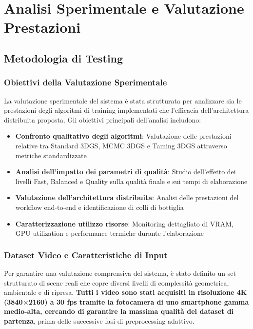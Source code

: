 \chapter{Analisi Sperimentale e Valutazione Prestazioni}
\label{chap:analisi_sperimentale}

\section{Metodologia di Testing}
\label{sec:metodologia_testing}

\subsection{Obiettivi della Valutazione Sperimentale}
\label{subsec:obiettivi_valutazione}

La valutazione sperimentale del sistema è stata strutturata per analizzare sia le prestazioni degli algoritmi di training implementati che l'efficacia dell'architettura distribuita proposta. Gli obiettivi principali dell'analisi includono:

\begin{itemize}
	\item \textbf{Confronto qualitativo degli algoritmi}: Valutazione delle prestazioni relative tra Standard 3DGS, MCMC 3DGS e Taming 3DGS attraverso metriche standardizzate
	\item \textbf{Analisi dell'impatto dei parametri di qualità}: Studio dell'effetto dei livelli Fast, Balanced e Quality sulla qualità finale e sui tempi di elaborazione
	\item \textbf{Valutazione dell'architettura distribuita}: Analisi delle prestazioni del workflow end-to-end e identificazione di colli di bottiglia
	\item \textbf{Caratterizzazione utilizzo risorse}: Monitoring dettagliato di VRAM, GPU utilization e performance termiche durante l'elaborazione
\end{itemize}

\subsection{Dataset Video e Caratteristiche di Input}
\label{subsec:dataset_video_input}

Per garantire una valutazione comprensiva del sistema, è stato definito un set strutturato di scene reali che copre diversi livelli di complessità geometrica, ambientale e di ripresa. \textbf{Tutti i video sono stati acquisiti in risoluzione 4K (3840×2160) a 30 fps tramite la fotocamera di uno smartphone gamma medio-alta, cercando di garantire la massima qualità del dataset di partenza}, prima delle successive fasi di preprocessing adattivo.


